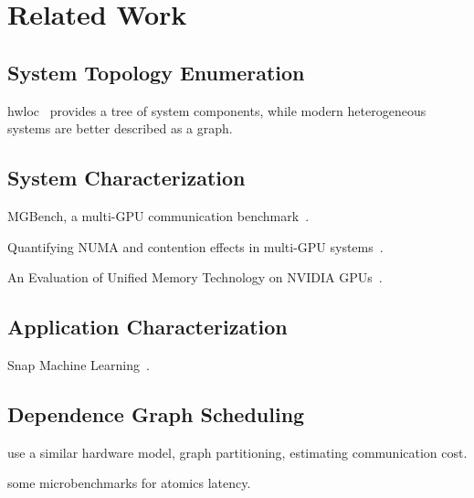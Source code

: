 \chapter{Related Work}
\label{ch:related}

\section{System Topology Enumeration}

hwloc~\cite{broquedis2010hwloc} provides a tree of system components, while modern heterogeneous systems are better described as a graph.


\section{System Characterization}

MGBench, a multi-GPU communication benchmark~\cite{bennun2016mgbench}.

Quantifying NUMA and contention effects in multi-GPU systems~\cite{spafford2011quantifying}.

An Evaluation of Unified Memory Technology on NVIDIA GPUs~\cite{li2015evaluation}.

\section{Application Characterization}

Snap Machine Learning~\cite{dunner2018snap}.


\section{Dependence Graph Scheduling}

\cite{amaral2017topology} use a similar hardware model, graph partitioning, estimating communication cost.

\cite{gomez2013performance} some microbenchmarks for atomics latency.